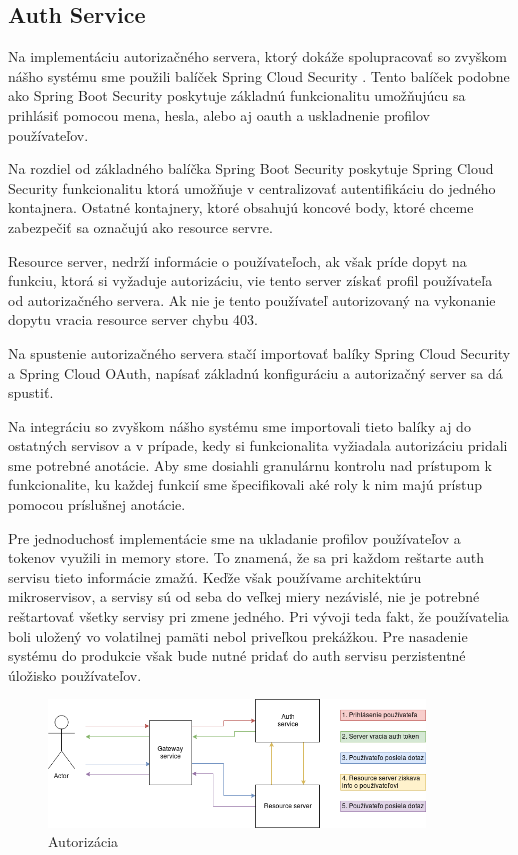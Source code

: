 \subsection{Auth Service}  \label{section_auth}

Na implementáciu autorizačného servera, ktorý dokáže spolupracovať so zvyškom nášho systému sme použili balíček Spring Cloud Security \cite{cloud_security}. Tento balíček podobne ako Spring Boot Security poskytuje základnú funkcionalitu umožňujúcu sa prihlásiť pomocou mena, hesla, alebo aj \acrshort{oauth} a uskladnenie profilov používateľov.

Na rozdiel od základného balíčka Spring Boot Security poskytuje Spring Cloud Security funkcionalitu ktorá umožňuje v centralizovať autentifikáciu do jedného kontajnera. Ostatné kontajnery, ktoré obsahujú koncové body, ktoré chceme zabezpečiť sa označujú ako resource servre.

Resource server, nedrží informácie o používateľoch, ak však príde dopyt na funkciu, ktorá si vyžaduje autorizáciu, vie tento server získať profil používateľa od autorizačného servera. Ak nie je tento používateľ autorizovaný na vykonanie dopytu vracia resource server chybu 403.

Na spustenie autorizačného servera stačí importovať balíky  Spring Cloud Security a Spring Cloud OAuth, napísať základnú konfiguráciu a autorizačný server sa dá spustiť.

Na integráciu so zvyškom nášho systému sme importovali tieto balíky aj do ostatných servisov a v prípade, kedy si funkcionalita vyžiadala autorizáciu  pridali sme potrebné anotácie. Aby sme dosiahli granulárnu kontrolu nad prístupom k funkcionalite, ku každej funkcií sme špecifikovali aké roly k nim majú prístup pomocou príslušnej anotácie.

Pre jednoduchosť implementácie sme na ukladanie profilov používateľov a tokenov využili in memory store. To znamená, že sa pri každom reštarte auth servisu tieto informácie zmažú. Keďže však používame architektúru mikroservisov, a servisy sú od seba do veľkej miery nezávislé, nie je potrebné reštartovať všetky servisy pri zmene jedného. Pri vývoji teda fakt, že používatelia boli uložený vo volatilnej pamäti nebol priveľkou prekážkou. Pre nasadenie systému do produkcie však bude nutné pridať do auth servisu perzistentné úložisko používateľov.


\begin{figure}[!htbp]
	\centering
	\includegraphics[width=10cm]{img/auth_operation.png}
	\caption{Autorizácia}
	\label{auth_operation}
\end{figure}

